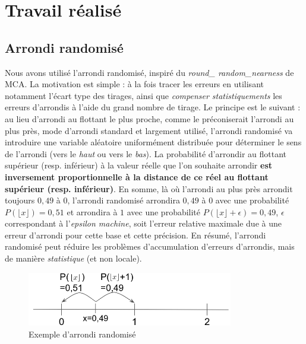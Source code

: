 \documentclass[a4paper,11pt]{article}
\begin{document}


\section{Travail réalisé}

\subsection{Arrondi randomisé }
Nous avons utilisé l'arrondi randomisé, inspiré du \textit{round\_ random\_nearness} de MCA. 
La motivation est simple : à la fois tracer les erreurs en utilisant notamment l'écart type des tirages, ainsi que \textit{compenser statistiquements} les erreurs d'arrondis à l'aide du grand nombre de tirage.
Le principe est le suivant : au lieu d'arrondi au flottant le plus proche, comme le préconiserait l'arrondi au plus près, mode d'arrondi standard et largement utilisé, l'arrondi randomisé va introduire une variable aléatoire uniformément distribuée pour déterminer le sens de l'arrondi (vers le \textit{haut} ou vers le \textit{bas}).
La probabilité d'arrondir au flottant supérieur (resp. inférieur) à la valeur réelle que l'on souhaite arrondir \textbf{est inversement proportionnelle à la distance de ce réel au flottant supérieur (resp. inférieur)}. En somme, là où l'arrondi au plus près arrondit toujours $0,49$ à $0$, l'arrondi randomisé arrondira $0,49$ à $0$ avec une probabilité $P(\lfloor x\rfloor )=0,51$ et arrondira à $1$ avec une probabilité $P(\lfloor x\rfloor + \epsilon)=0,49$, $\epsilon$ correspondant à l'\textit{epsilon machine}, soit l'erreur relative maximale due à une erreur d'arrondi pour cette base et cette précision. En résumé, l'arrondi randomisé peut réduire les problèmes d'accumulation d'erreurs d'arrondis, mais de manière \textit{statistique} (et non locale).
\begin{figure}[h]
  \begin{center}
    \includegraphics[width=9cm]{random_rounding}
    \caption{Exemple d'arrondi randomisé}
    \label{random_rounding}
  \end{center}
\end{figure}
\end{document}

